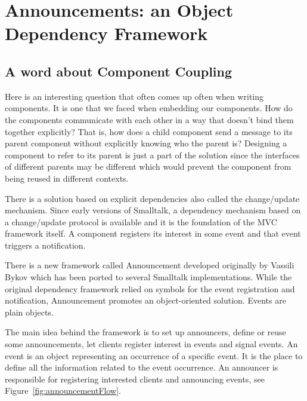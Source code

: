 \documentclass[a4paper,10pt,twoside]{book}
\begin{document}
\fi
\sloppy
\chapter{Announcements: an Object Dependency Framework}

\section{A word about Component Coupling}

Here is an interesting question that often comes up often when writing
components. It is one that we faced when embedding our components. How
do the components communicate with each other in a way that doesn't
bind them together explicitly? That is, how does a child component
send a message to its parent component without explicitly knowing who
the parent is? Designing a component to refer to its parent is just a
part of the solution since the interfaces of different parents may be
different which would prevent the component from being reused in
different contexts.

There is a solution based on explicit dependencies also called the
change/update mechanism. Since early versions of Smalltalk, a
dependency mechanism based on a change/update protocol is available
and it is the foundation of the MVC framework itself. A component
registers its interest in some event and that event triggers a
notification. 

There is a new framework called Announcement developed originally by
Vassili Bykov which has been ported to several Smalltalk
implementations. While the original dependency framework relied on
symbols for the event registration and notification, Announcement
promotes an object-oriented solution. Events are plain objects.

The main idea behind the framework is to set up announcers, define or
reuse some announcements, let clients register interest in events and
signal events. An event is an object representing an occurrence of a
specific event. It is the place to define all the information related
to the event occurrence. An announcer is responsible for registering
interested clients and announcing events, see Figure~\ref{fig:announcementFlow}.
\end{document}
